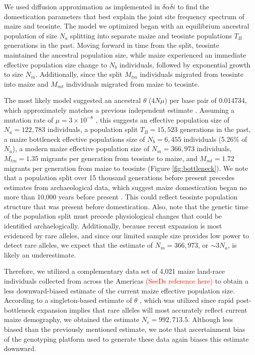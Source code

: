 \documentclass{pnastwo}
\begin{document}
\begin{article}
We used diffusion approximation as implemented in
$\delta\alpha\delta{i}$ \cite{gutenkunst2009} to find the domestication parameters that best explain
the joint site frequency spectrum of maize and teosinte.  The model we optimized began with an
equilibrium ancestral population of size $N_a$
splitting into separate maize and teosinte populations $T_B$ generations in the past. Moving forward in
time from the split, teosinte maintained the ancestral population size, while
maize experienced an immediate effective population size change to
$N_b$ individuals, followed by exponential growth to size
$N_m$. Additionally, since the split $M_{tm}$ individuals migrated
from teosinte into maize and $M_{mt}$ individuals migrated from maize
to teosinte.

The most likely model suggested an ancestral $\theta$ ($4N\mu$) per base pair of
0.014734, which approximately matches a previous independent estimate \cite{eyre1998}. Assuming a mutation rate of $\mu =
3 \times 10^{-8}$ \cite{clark2005}, this suggests an effective
population size of $N_a = 122,783$ individuals, a population split
$T_B = 15,523$ generations in the past, a maize bottleneck
effective populations size of $N_b = 6,455$ individuals (5.26\% of
$N_a$), a modern maize effective population size of $N_m = 366,973$
individuals, $M_{tm} = 1.35$ migrants per generation from teosinte to
maize, and $M_{mt} = 1.72$ migrants per generation from maize to
teosinte (Figure \ref{fig:bottleneck}). We note that a population
split over 15 thousand generations before present precedes estimates
from
archaeological data, which suggest maize domestication began
no more than 10,000 years before present \cite{smith1995}. This could reflect teosinte population structure that was present before
domestication. Also, note that the genetic time of the population
split must precede physiological changes that could be identified
archaelogically.   Additionally, because recent expansion is
most evidenced by rare alleles, and since our limited sample size provides low
power to detect rare alleles, we expect that the estimate of  $N_m = 366,973$, or $\sim 3N_a$, is likely an underestimate.

Therefore, we utilized a complementary data set of 4,021 maize land-race individuals collected
from across the Americas \textcolor{red}{(SeeDs reference here)} to
obtain a less downward-biased estimate of the current maize effective
population size. According to a singleton-based estimate of $\theta$
\cite{fu1993}, which was utilized since rapid post-bottleneck expansion
implies that rare alleles will most accurately reflect current maize
demography, we obtained the estimate $N_e =
  992,713.5$. Although less biased than the previously mentioned
estimate, we note that ascertainment bias of the
genotyping platform used to generate these data again biases this
estimate downward.


\end{article}
\end{document}
